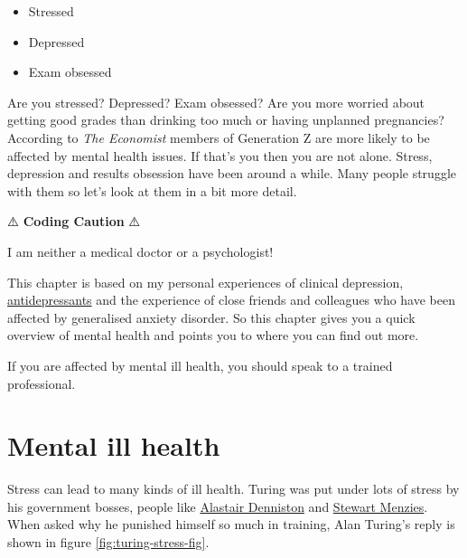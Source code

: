\documentclass[
]{book}
\providecommand{\tightlist}{%
  \setlength{\itemsep}{0pt}\setlength{\parskip}{0pt}}
\begin{document}
\begin{itemize}
\tightlist
\item
  Stressed
\item
  Depressed
\item
  Exam obsessed
\end{itemize}

Are you stressed? Depressed? Exam obsessed? Are you more worried about getting good grades than drinking too much or having unplanned pregnancies? According to \emph{The Economist} members of Generation Z are more likely to be affected by mental health issues. \citep{generationz} If that's you then you are not alone. Stress, depression and results obsession have been around a while. Many people struggle with them so let's look at them in a bit more detail.

⚠️ \textbf{Coding Caution} ⚠️

I am neither a medical doctor or a psychologist!

This chapter is based on my personal experiences of clinical depression, \href{https://en.wikipedia.org/wiki/Antidepressant}{antidepressants} and the experience of close friends and colleagues who have been affected by generalised anxiety disorder. So this chapter gives you a quick overview of mental health and points you to where you can find out more.

If you are affected by mental ill health, you should speak to a trained professional.

\hypertarget{illhealth}{%
\section{Mental ill health}\label{illhealth}}

Stress can lead to many kinds of ill health. Turing was put under lots of stress by his government bosses, people like \href{https://en.wikipedia.org/wiki/Alastair_Denniston}{Alastair Denniston} and \href{https://en.wikipedia.org/wiki/Stewart_Menzies}{Stewart Menzies}. \citep{imitationgame} When asked why he punished himself so much in training, Alan Turing's reply is shown in figure \ref{fig:turing-stress-fig}.
\end{document}
